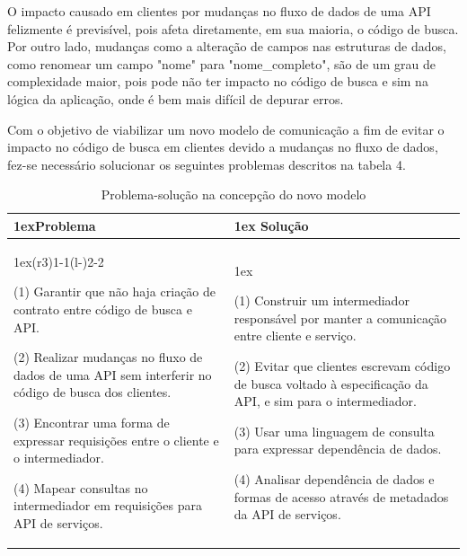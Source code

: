 O impacto causado em clientes por mudanças no fluxo de dados de uma API felizmente é previsível, pois afeta diretamente, em sua maioria, o código de busca. Por outro lado, mudanças como a alteração de campos nas estruturas de dados, como renomear um campo "nome" para "nome\_completo", são de um grau de complexidade maior, pois pode não ter impacto no código de busca e sim na lógica da aplicação, onde é bem mais difícil de depurar erros.

Com o objetivo de viabilizar um novo modelo de comunicação a fim de evitar o impacto no código de busca em clientes devido a mudanças no fluxo de dados, fez-se necessário solucionar os seguintes problemas descritos na tabela 4. \\

\begin{table}[H]
  \begin{tabularx}{\linewidth}{>{\parskip1ex}X@{\kern4\tabcolsep}>{\parskip1ex}X}
    \toprule
    \hfil\bfseries Problema
    &
    \hfil\bfseries Solução
    \\\cmidrule(r{3\tabcolsep}){1-1}\cmidrule(l{-\tabcolsep}){2-2}

    (1) Garantir que não haja criação de contrato entre código de busca e API.\par
    (2) Realizar mudanças no fluxo de dados de uma API sem interferir no código de busca dos clientes.\par
    (3) Encontrar uma forma de expressar requisições entre o cliente e o intermediador.\par
    (4) Mapear consultas no intermediador em requisições para API de serviços.\par

    &

    (1) Construir um intermediador responsável por manter a comunicação entre cliente e serviço.\par
	(2) Evitar que clientes escrevam código de busca voltado à especificação da API, e sim para o intermediador.\par
    (3) Usar uma linguagem de consulta para expressar dependência de dados.\par
    (4) Analisar dependência de dados e formas de acesso através de metadados da API de serviços.\par

\\\bottomrule
  \end{tabularx}
  \caption{Problema-solução na concepção do novo modelo}
\end{table}
